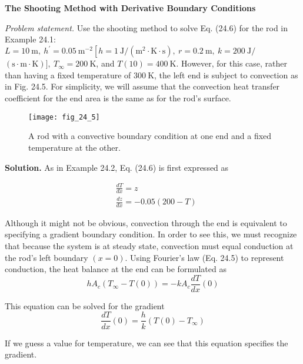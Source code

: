 \documentclass[../main.tex]{subfiles}
\begin{document}
\begin{exmp}
    \textbf{The Shooting Method with Derivative Boundary Conditions}

    \noindent\textit{Problem statement.} Use the shooting method to solve Eq. (24.6) for the rod in Example 24.1: $L=10 \mathrm{~m},\ h^{\prime}=0.05 \mathrm{~m}^{-2}\left[h=1 \mathrm{~J} /\left(\mathrm{m}^{2} \cdot \mathrm{K} \cdot \mathrm{s}\right),\ r=0.2 \mathrm{~m},\ k=200 \mathrm{~J} /\right.$ $(\mathrm{s} \cdot \mathrm{m} \cdot \mathrm{K})],\ T_{\infty}=200 \mathrm{~K}$, and $T(10)=400 \mathrm{~K}$.
    However, for this case, rather than having a fixed temperature of $300 \mathrm{~K}$, the left end is subject to convection as in Fig. 24.5. For simplicity, we will assume that the convection heat transfer coefficient for the end area is the same as for the rod's surface.

    \begin{figure}[H]
        \centering
        \texttt{[image: fig\_24\_5]}
       \caption{\textsf{A rod with a convective boundary condition at one end and a fixed temperature at the other.}}\label{fig:fig_24_5}
    \end{figure}
    \noindent\textbf{Solution.} As in Example 24.2, Eq. (24.6) is first expressed as

    $$
    \begin{aligned}
    &\frac{d T}{d x}=z \\
    &\frac{d z}{d x}=-0.05(200-T)
    \end{aligned}
    $$

    Although it might not be obvious, convection through the end is equivalent to specifying a gradient boundary    condition. In order to see this, we must recognize that because the system is at steady state, convection must equal conduction at the rod's left boundary $(x=0)$. Using Fourier's law (Eq. 24.5) to represent conduction, the heat balance at the end can be formulated as
    \begin{equation}
        \tag{24.12}
        h A_{c}\left(T_{\infty}-T(0)\right)=-k A_{c} \frac{d T}{d x}(0)
    \end{equation}
    
    This equation can be solved for the gradient
    \begin{equation}
        \tag{24.13}
        \frac{d T}{d x}(0)=\frac{h}{k}\left(T(0)-T_{\infty}\right)
    \end{equation}
    
    \noindent If we guess a value for temperature, we can see that this equation specifies the gradient.


\end{exmp}
\end{document}
